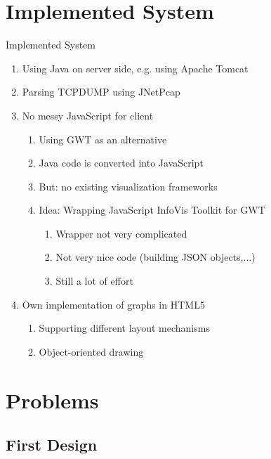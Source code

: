 \documentclass{beamer}
\begin{document}
\section{Implemented System}

\begin{frame}{Implemented System}
 \begin{enumerate}
  \item Using Java on server side, e.g. using Apache Tomcat \cite{Tomcat}
  \item Parsing TCPDUMP using JNetPcap
  \item No messy JavaScript for client
  \begin{enumerate}
    \item Using GWT as an alternative
    \item Java code is converted into JavaScript
    \item But: no existing visualization frameworks
    \item Idea: Wrapping JavaScript InfoVis Toolkit for GWT
    \begin{enumerate}
      \item Wrapper not very complicated
      \item Not very nice code (building JSON objects,...)
      \item Still a lot of effort
    \end{enumerate}
  \end{enumerate}
  \item Own implementation of graphs in HTML5
        \begin{enumerate}
	  \item Supporting different layout mechanisms
	  \item Object-oriented drawing
	\end{enumerate}
 \end{enumerate}
\end{frame}


\section{Problems}

\subsection{First Design}
\end{document}
